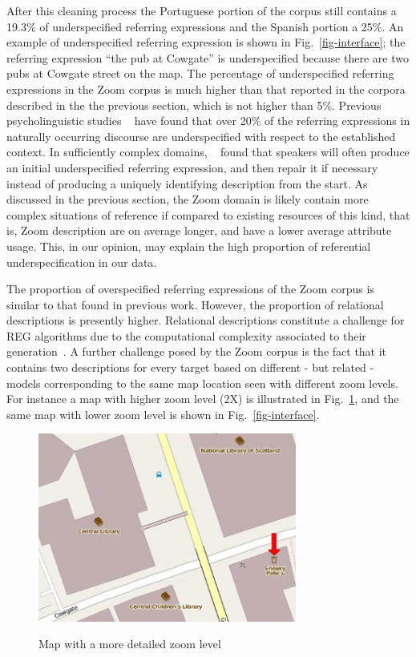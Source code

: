 \documentclass{article}
\begin{document}
After this cleaning process the Portuguese portion of the corpus still contains a 19.3\% of underspecified referring expressions and the Spanish portion a 25\%. An example of underspecified referring expression is shown in Fig.~\ref{fig-interface}; the referring expression ``the pub at Cowgate'' is underspecified because there are two pubs at Cowgate street on the map. The percentage of underspecified referring expressions in the Zoom corpus is much higher than that reported in the corpora described in the the previous section, which is not higher than 5\%. Previous psycholinguistic studies ~\cite{Clark1986} have found that over 20\% of the referring expressions in naturally occurring discourse are underspecified with respect to the established context. In sufficiently complex domains, ~\cite{Clark1986} found that speakers will often produce an initial underspecified referring expression, and then repair it if necessary instead of producing a uniquely identifying description from the start. As discussed in the previous section, the Zoom domain is likely contain more complex situations of reference if compared to existing resources of this kind, that is,  Zoom description are on average longer, and have a lower average attribute usage. This, in our opinion, may explain the high proportion of referential underspecification in our data.   

The proportion of overspecified referring expressions of the Zoom corpus is similar to that found in previous work. However, the proportion of relational descriptions is presently higher. Relational descriptions constitute a challenge for REG algorithms due to the computational complexity associated to their generation~\cite{survey}. A further challenge posed by the Zoom corpus is the fact that it contains two descriptions for every target based on different - but related - models corresponding to the same map location seen with different zoom levels. For instance a map with higher zoom level (2X) is illustrated in Fig.~\ref{fig-with-zoom}, and the same map with lower zoom level is shown in Fig.~\ref{fig-interface}. 

\begin{figure}[ht]
\begin{center}
\includegraphics[width=8.5cm]{figures/with-zoom.jpg}\\[0pt]
\caption{Map with a more detailed zoom level}
\label{fig-with-zoom}
\end{center}
\end{figure}
\end{document}
